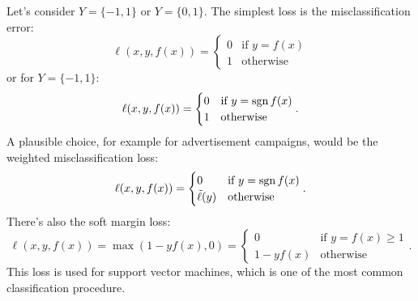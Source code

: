 \documentclass[../lecture-notes.tex]{subfiles}
\begin{document}
Let's consider $Y = \{ -1, 1 \}$ or $Y = \{ 0, 1 \}$.
The simplest loss is the misclassification error:
\[
	\ell(x, y, f(x)) = \begin{cases}
	0 & \text{if } y = f(x) \\
	1 & \text{otherwise}
	\end{cases}
\]
or for $Y = \{ -1, 1 \}$:
\[
	\ell(x, y, f(x)) = \begin{cases}
	0 & \text{if } y = \operatorname{sgn} f(x) \\
	1 & \text{otherwise}
	\end{cases}.
\]
A plausible choice, for example for advertisement campaigns, would be the weighted misclassification loss:
\[
	\ell(x, y, f(x)) = \begin{cases}
	0 & \text{if } y = \operatorname{sgn} f(x) \\
	\tilde{\ell}(y) & \text{otherwise}
	\end{cases}.
\]
There's also the soft margin loss:
\[
	\ell(x, y, f(x)) = \max(1 - yf(x), 0) = \begin{cases}
	0 & \text{if } y = f(x) \geq 1 \\
	1 - y f(x) & \text{otherwise}
	\end{cases}.
\]
This loss is used for support vector machines, which is one of the most common classification procedure.
\end{document}
